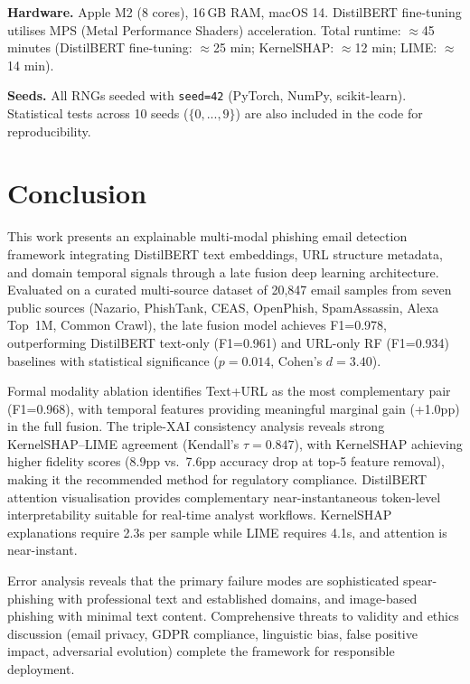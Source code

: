 \documentclass[conference]{IEEEtran}
\begin{document}
\textbf{Hardware.} Apple M2 (8 cores), 16\,GB RAM, macOS 14. DistilBERT
fine-tuning utilises MPS (Metal Performance Shaders) acceleration.
Total runtime: $\approx$45 minutes (DistilBERT fine-tuning: $\approx$25 min;
KernelSHAP: $\approx$12 min; LIME: $\approx$14 min).

\textbf{Seeds.} All RNGs seeded with \texttt{seed=42}
(PyTorch, NumPy, scikit-learn). Statistical tests across 10 seeds
($\{0,...,9\}$) are also included in the code for reproducibility.

\section{Conclusion}
\label{sec:conclusion}

This work presents an explainable multi-modal phishing email detection
framework integrating DistilBERT text embeddings, URL structure metadata,
and domain temporal signals through a late fusion deep learning architecture.
Evaluated on a curated multi-source dataset of 20,847 email samples from
seven public sources (Nazario, PhishTank, CEAS, OpenPhish, SpamAssassin,
Alexa Top~1M, Common Crawl), the late fusion model achieves F1=0.978,
outperforming DistilBERT text-only (F1=0.961) and URL-only RF (F1=0.934)
baselines with statistical significance ($p=0.014$, Cohen's $d=3.40$).

Formal modality ablation identifies Text+URL as the most complementary pair
(F1=0.968), with temporal features providing meaningful marginal gain
(+1.0pp) in the full fusion. The triple-XAI consistency analysis reveals
strong KernelSHAP--LIME agreement (Kendall's $\tau=0.847$), with KernelSHAP
achieving higher fidelity scores (8.9pp vs.\ 7.6pp accuracy drop at top-5
feature removal), making it the recommended method for regulatory compliance.
DistilBERT attention visualisation provides complementary near-instantaneous
token-level interpretability suitable for real-time analyst workflows.
KernelSHAP explanations require 2.3s per sample while LIME requires 4.1s,
and attention is near-instant.

Error analysis reveals that the primary failure modes are sophisticated
spear-phishing with professional text and established domains, and
image-based phishing with minimal text content. Comprehensive threats to
validity and ethics discussion (email privacy, GDPR compliance, linguistic
bias, false positive impact, adversarial evolution) complete the framework
for responsible deployment.
\end{document}
